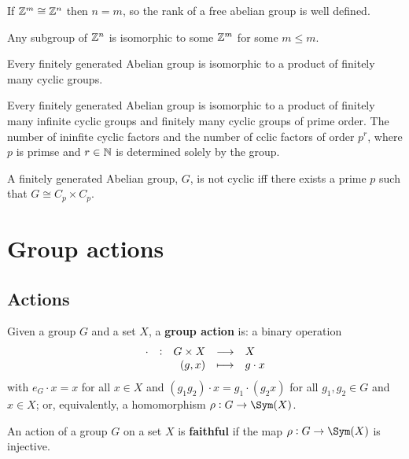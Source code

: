 \documentclass[../Year2.tex]{subfiles}
\begin{document}
\begin{lemma}
    If $\mathbb{Z}^m\cong\mathbb{Z}^n$ then $n=m$, so the rank of a free abelian group is well defined.
\end{lemma}

\begin{lemma}
    Any subgroup of $\mathbb{Z}^n$ is isomorphic to some $\mathbb{Z}^m$ for some $m\leq m$.
\end{lemma}

\begin{theorem}
    Every finitely generated Abelian group is isomorphic to a product of finitely many cyclic groups.
\end{theorem}

\begin{theorem}
    Every finitely generated Abelian group is isomorphic to a product of finitely many infinite cyclic groups and finitely many cyclic groups of prime order. The number of ininfite cyclic factors and the number of cclic factors of order $p^r$, where $p$ is primse and $r\in\mathbb{N}$ is determined solely by the group.
\end{theorem}

\begin{theorem}
    A finitely generated Abelian group, $G$, is not cyclic iff there exists a prime $p$ such that $G\cong C_p\times C_p$.
\end{theorem}

\section{Group actions}

\subsection{Actions}

\begin{definition}[Actions]
    Given a group $G$ and a set $X$, a \textbf{group action} is: a binary operation \[
        \function[\cdot]{G\times X}{X}{(g,x)}{g\cdot x}
    \] with $e_G\cdot x=x$ for all $x\in X$ and $(g_1g_2)\cdot x = g_1 \cdot (g_2 x)$ for all $g_1,g_2\in G$ and $x\in X$; or, equivalently, a homomorphism $\rho:G\rightarrow \Sym(X)$.
\end{definition}

\begin{definition}
    An action of a group $G$ on a set $X$ is \textbf{faithful} if the map $\rho:G\rightarrow\Sym(X)$ is injective.
\end{definition}
\end{document}
